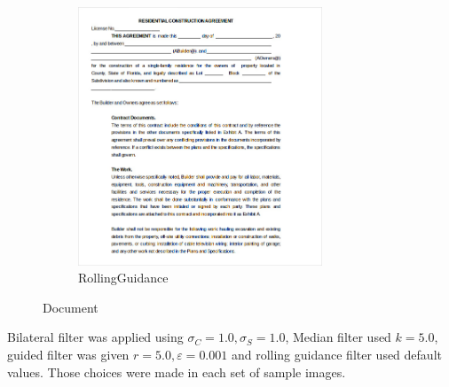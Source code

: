 \documentclass[12pt]{article}
\begin{document}
\begin{figure}
		\begin{subfigure}{0.4\textwidth}
			\centering
			\includegraphics[width=0.8\textwidth]{document/documentjpgRollingGuidanceFilter.png}
			\caption{RollingGuidance}
		\end{subfigure}
		\caption{Document}
	\end{figure}

	Bilateral filter was applied using $\sigma_C = 1.0, \sigma_S = 1.0$, Median filter used $k = 5.0$, guided filter was given $r = 5.0, \varepsilon = 0.001$ and rolling guidance filter used default values. Those choices were made in each set of sample images.
	
\end{document}
